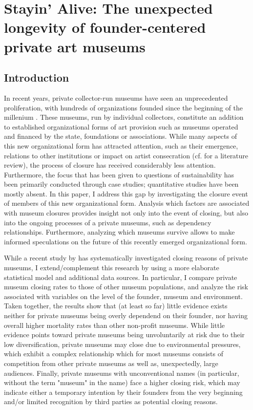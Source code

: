 \documentclass[12pt]{article}
\author{Johannes }
\date{\today}
\title{}
\begin{document}
\section*{Stayin' Alive: The unexpected longevity of founder-centered private art museums}

\subsection*{Introduction}


In recent years, private collector-run museums have seen an unprecedented proliferation, with hundreds of organizations founded since the beginning of the millenium \parencite{Velthuis_etal_2023_boom,LarrysList_2015_report}.
These museums, run by individual collectors, constitute an addition to established organizational forms of art provision such as museums operated and financed by the state, foundations or associations.
While many aspects of this new organizational form has attracted attention, such as their emergence, relations to other institutions or impact on artist consecration (cf. \cite{Kolbe_etal_2022_privatemuseum} for a literature review), the process of closure has received considerably less attention. 
Furthermore, the focus that has been given to questions of sustainability has been primarily conducted through case studies; quantitative studies have been mostly absent.
In this paper, I address this gap by investigating the closure event of members of this new organizational form.
Analysis which factors are associated with museum closures provides insight not only into the event of closing, but also into the ongoing processes of a private museums, such as dependency relationships.
Furthermore, analyzing which museums survive allows to make informed speculations on the future of this recently emerged organizational form.


While a recent study by \textcite{Velthuis_Gera_2024_fragility} has systematically investigated closing reasons of private museums, I extend/complement this research by using a more elaborate statistical model and additional data sources.
In particular, I compare private museum closing rates to those of other museum populations, and analyze the risk associated with variables on the level of the founder, museum and environment. 
Taken together, the results show that (at least so far) little evidence exists neither for private museums being overly dependend on their founder, nor having overall higher mortality rates than other non-profit museums.
While little evidence points toward private museums being unvoluntarily at risk due to their low diversification, private museums may close due to environmental pressures, which exhibit a complex relationship which for most museums consists of competition from other private museums as well as, unexpectedly, large audiences.
Finally, private museums with unconventional names (in particular, without the term "museum" in the name) face a higher closing risk, which may indicate either a temporary intention by their founders from the very beginning and/or limited recognition by third parties as potential closing reasons.
\end{document}
